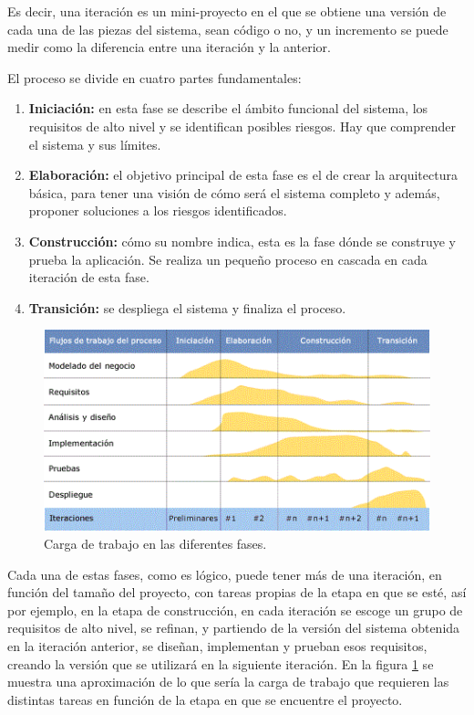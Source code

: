 Es decir, una iteración es un mini-proyecto en el que se obtiene una versión de cada una de las piezas del sistema, sean código o no, y un incremento se puede medir como la diferencia entre una iteración y la anterior.
\newline

El proceso se divide en cuatro partes fundamentales:

\begin{enumerate}

	\item \textbf{Iniciación:} en esta fase se describe el ámbito funcional del sistema, los requisitos de alto nivel y se identifican posibles riesgos. Hay que comprender el sistema y sus límites.

	\item \textbf{Elaboración:} el objetivo principal de esta fase es el de crear la arquitectura básica, para tener una visión de cómo será el sistema completo y además, proponer soluciones a los riesgos identificados.

	\item \textbf{Construcción:} cómo su nombre indica, esta es la fase dónde se construye y prueba la aplicación. Se realiza un pequeño proceso en cascada en cada iteración de esta fase.

	\item \textbf{Transición:} se despliega el sistema y finaliza el proceso.

\end{enumerate}


\begin{figure}[!h]
    \centering
    \includegraphics[]{planificacion/trabajoFases}
    \caption{Carga de trabajo en las diferentes fases.}
    \label{fig:planificacion:trabajoFases}
\end{figure}

Cada una de estas fases, como es lógico, puede tener más de una iteración, en función del tamaño del proyecto, con tareas propias de la etapa en que se esté, así por ejemplo, en la etapa de construcción, en cada iteración se escoge un grupo de requisitos de alto nivel, se refinan, y partiendo de la versión del sistema obtenida en la iteración anterior, se diseñan, implementan y prueban esos requisitos, creando la versión que se utilizará en la siguiente iteración. En la figura \ref{fig:planificacion:trabajoFases} se muestra una aproximación de lo que sería la carga de trabajo que requieren las distintas tareas en función de la etapa en que se encuentre el proyecto.
\newline

